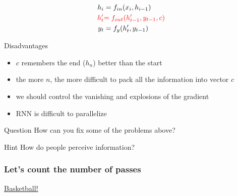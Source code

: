 \documentclass[fullscreen=true, bookmarks=true, hyperref={pdfencoding=unicode}]{beamer}
\begin{document}
\begin{frame}
  \begin{center}
    \begin{align*}
      h_i &= f_{in}(x_i, h_{i-1}) \\
      {\color{red}h_t^\prime} &{\color{red}= f_{out}(h_{t-1}^\prime,y_{t-1},c)} \\
      y_t &= f_{y}(h_t^\prime, y_{t-1})
    \end{align*}
  \end{center}

  \pause
  Disadvantages
    \begin{itemize}
      \item $c$ remembers the end ($h_n$) better than the start
      \item the more $n$, the more difficult to pack all the information into vector $c$
      \item we should control the vanishing and explosions of the gradient
      \item RNN is difficult to parallelize
    \end{itemize}
    \pause
    \begin{block}{Question}
      How can you fix some of the problems above?
    \end{block}
    \pause
    \begin{exampleblock}{Hint}
      How do people perceive information?
    \end{exampleblock}
\end{frame}


\begin{frame}
  \frametitle{Let's count the number of passes}

  \begin{center}
    \href{https://www.youtube.com/watch?v=vJG698U2Mvo}{Basketball!}
  \end{center}
\end{frame}

\end{document}
